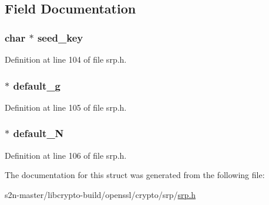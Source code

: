 \subsection{Field Documentation}
\subsubsection[{\texorpdfstring{seed\+\_\+key}{seed_key}}]{\setlength{\rightskip}{0pt plus 5cm}char $\ast$ seed\+\_\+key}\hypertarget{struct_s_r_p___v_b_a_s_e__st_aed2d5c5604b80eda9d2c9e7b975b7954}{}\label{struct_s_r_p___v_b_a_s_e__st_aed2d5c5604b80eda9d2c9e7b975b7954}


Definition at line 104 of file srp.\+h.

\subsubsection[{\texorpdfstring{default\+\_\+g}{default_g}}]{ $\ast$ default\+\_\+g}\hypertarget{struct_s_r_p___v_b_a_s_e__st_a57aedcf7d4f360478edc404f5ffea678}{}\label{struct_s_r_p___v_b_a_s_e__st_a57aedcf7d4f360478edc404f5ffea678}


Definition at line 105 of file srp.\+h.

\subsubsection[{\texorpdfstring{default\+\_\+N}{default_N}}]{ $\ast$ default\+\_\+N}\hypertarget{struct_s_r_p___v_b_a_s_e__st_a27d9dc592359b2cb451c693f8e62da6c}{}\label{struct_s_r_p___v_b_a_s_e__st_a27d9dc592359b2cb451c693f8e62da6c}


Definition at line 106 of file srp.\+h.



The documentation for this struct was generated from the following file\+:\begin{DoxyCompactItemize}
\item 
s2n-\/master/libcrypto-\/build/openssl/crypto/srp/\hyperlink{crypto_2srp_2srp_8h}{srp.\+h}\end{DoxyCompactItemize}
